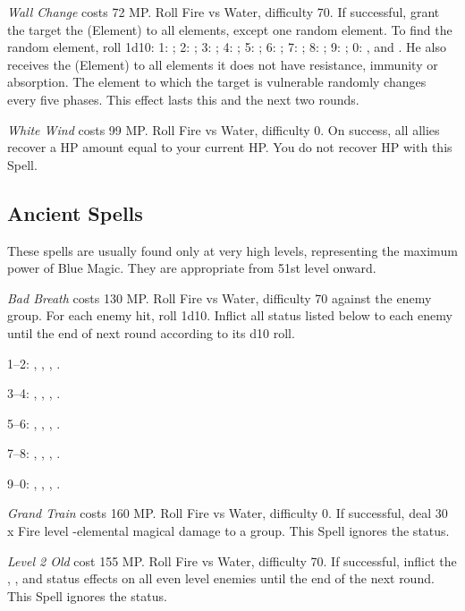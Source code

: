 \begin{multicols}{2}
	\textit{Wall Change} costs 72 MP\@. Roll Fire vs Water, difficulty 70. If successful, grant the target the (Element)  to all elements, except one random element. To find the random element, roll 1d10: 1: ; 2: ; 3: ; 4: ; 5: ; 6: ; 7: ; 8: ; 9: ; 0: ,  and . He also receives the (Element)  to all elements it does not have resistance, immunity or absorption. The element to which the target is vulnerable randomly changes every five phases. This effect lasts this and the next two rounds.
    
    \textit{White Wind} costs 99 MP\@. Roll Fire vs Water, difficulty 0. On success, all allies recover a HP amount equal to your current HP\@. You do not recover HP with this Spell.

\subsection{Ancient Spells}\label{subsec:blue-ancient}

	These spells are usually found only at very high levels, representing the maximum power of Blue Magic. They are appropriate from 51st level onward.
    
    \textit{Bad Breath} costs 130 MP\@. Roll Fire vs Water, difficulty 70 against the enemy group. For each enemy hit, roll 1d10. Inflict all status listed below to each enemy until the end of next round according to its d10 roll.

1--2: , , , .

3--4: , , , .

5--6: , , , .

7--8: , , , .

9--0: , , , .

    \textit{Grand Train} costs 160 MP\@. Roll Fire vs Water, difficulty 0. If successful, deal 30 x Fire level -elemental magical damage to a group. This Spell ignores the  status.
    
    \textit{Level 2 Old} cost 155 MP\@. Roll Fire vs Water, difficulty 70. If successful, inflict the , ,  and  status effects on all even level enemies until the end of the next round. This Spell ignores the  status.
    

\end{multicols}
